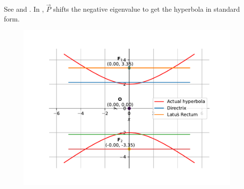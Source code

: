 See 
and 
.
In
, $\vec{P}$ shifts the negative eigenvalue 
to get the hyperbola in standard form.
\begin{figure}[H]
	\begin{center} 
	    \includegraphics[width=0.75\columnwidth]{chapters/11/11/4/5/figs/fig.pdf}
	\end{center}
\caption{}
\label{fig:chapters/11/11/4/5/1}
\end{figure}

